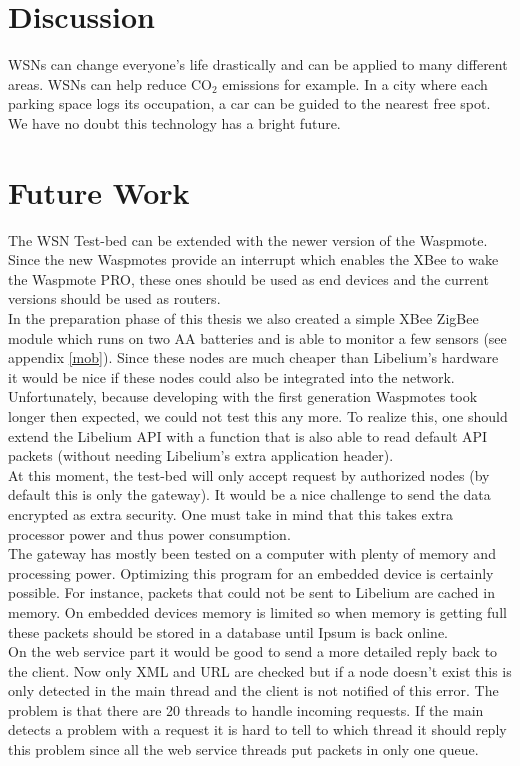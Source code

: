 \section{Discussion}
WSNs can change everyone's life drastically and can be applied to many different areas. WSNs can help reduce CO$_{2}$ emissions for example. In a city where each parking space logs its occupation, a car can be guided to the nearest free spot. We have no doubt this technology has a bright future.
\section{Future Work}
The WSN Test-bed can be extended with the newer version of the Waspmote. Since the new Waspmotes provide an interrupt which enables the XBee to wake the Waspmote PRO, these ones should be used as end devices and the current versions should be used as routers.\\
In the preparation phase of this thesis we also created a simple XBee ZigBee module which runs on two AA batteries and is able to monitor a few sensors (see appendix \ref{mob}). Since these nodes are much cheaper than Libelium's hardware it would be nice if these nodes could also be integrated into the network. Unfortunately, because developing with the first generation Waspmotes took longer then expected, we could not test this any more. To realize this, one should extend the Libelium API with a function that is also able to read default API packets (without needing Libelium's extra application header).\\
At this moment, the test-bed will only accept request by authorized nodes (by default this is only the gateway). It would be a nice challenge to send the data encrypted as extra security. One must take in mind that this takes extra processor power and thus power consumption.\\   
The gateway has mostly been tested on a computer with plenty of memory and processing power. Optimizing this program for an embedded device is certainly possible. For instance, packets that could not be sent to Libelium are cached in memory. On embedded devices memory is limited so when memory is getting full these packets should be stored in a database until Ipsum is back online.\\
On the web service part it would be good to send a more detailed reply back to the client. Now only XML and URL are checked but if a node doesn't exist this is only detected in the main thread and the client is not notified of this error. The problem is that there are 20 threads to handle incoming requests. If the main detects a problem with a request it is hard to tell to which thread it should reply this problem since all the web service threads put packets in only one queue.\\
